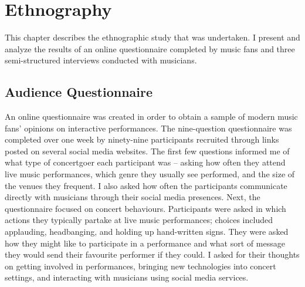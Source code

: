 \chapter{Ethnography}

This chapter describes the ethnographic study that was undertaken. I present and analyze the results of an online questionnaire completed by music fans and three semi-structured interviews conducted with musicians.

\section{Audience Questionnaire}

An online questionnaire was created in order to obtain a sample of modern music fans' opinions on interactive performances. The nine-question questionnaire was completed over one week by ninety-nine participants recruited through links posted on several social media websites. The first few questions informed me of what type of concertgoer each participant was -- asking how often they attend live music performances, which genre they usually see performed, and the size of the venues they frequent. I also asked how often the participants communicate directly with musicians through their social media presences. Next, the questionnaire focused on concert behaviours. Participants were asked in which actions they typically partake at live music performances; choices included applauding, headbanging, and holding up hand-written signs. They were asked how they might like to participate in a performance and what sort of message they would send their favourite performer if they could. I asked for their thoughts on getting involved in performances, bringing new technologies into concert settings, and interacting with musicians using social media services.

